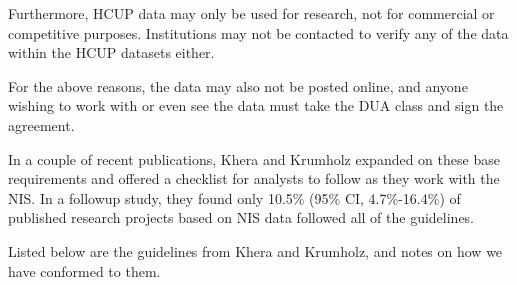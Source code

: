 \documentclass[12pt]{ociamthesis}\usepackage[]{graphicx}\usepackage[]{color}
\begin{document}
Furthermore, HCUP data may only be used for research, not for commercial or competitive purposes. Institutions may not be contacted
to verify any of the data within the HCUP datasets either. 

For the above reasons, the data may also not be posted online, and anyone wishing to work with or even see the data must take the DUA class and
sign the agreement. \cite{HCUPDUA}

In a couple of recent publications, Khera and Krumholz expanded on these base requirements and offered a checklist \cite{Krumholz2017} 
for analysts to follow as they work with the NIS. In a followup study, they found only 10.5\% (95\% CI, 4.7\%-16.4\%) of published research
projects based on NIS data followed all of the guidelines. \cite{Khera2017}

Listed below are the guidelines from Khera and Krumholz, and notes on how we have conformed to them.
\end{document}
